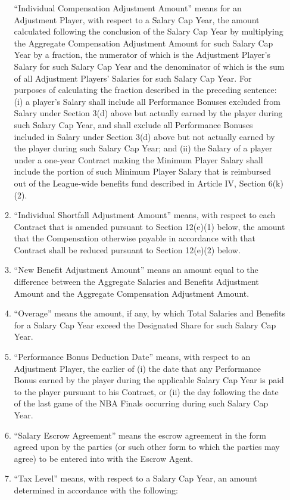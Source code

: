 \documentclass[
]{book}
\begin{document}
\begin{enumerate}
\begin{enumerate}
    ``Individual Compensation Adjustment Amount'' means for an Adjustment Player, with respect to a Salary Cap Year, the amount calculated following the conclusion of the Salary Cap Year by multiplying the Aggregate Compensation Adjustment Amount for such Salary Cap Year by a fraction, the numerator of which is the Adjustment Player's Salary for such Salary Cap Year and the denominator of which is the sum of all Adjustment Players' Salaries for such Salary Cap Year. For purposes of calculating the fraction described in the preceding sentence: (i) a player's Salary shall include all Performance Bonuses excluded from Salary under Section 3(d) above but actually earned by the player during such Salary Cap Year, and shall exclude all Performance Bonuses included in Salary under Section 3(d) above but not actually earned by the player during such Salary Cap Year; and (ii) the Salary of a player under a one-year Contract making the Minimum Player Salary shall include the portion of such Minimum Player Salary that is reimbursed out of the League-wide benefits fund described in Article IV, Section 6(k)(2).
  \item
    ``Individual Shortfall Adjustment Amount'' means, with respect to each Contract that is amended pursuant to Section 12(e)(1) below, the amount that the Compensation otherwise payable in accordance with that Contract shall be reduced pursuant to Section 12(e)(2) below.
  \item
    ``New Benefit Adjustment Amount'' means an amount equal to the difference between the Aggregate Salaries and Benefits Adjustment Amount and the Aggregate Compensation Adjustment Amount.
  \item
    ``Overage'' means the amount, if any, by which Total Salaries and Benefits for a Salary Cap Year exceed the Designated Share for such Salary Cap Year.
  \item
    ``Performance Bonus Deduction Date'' means, with respect to an Adjustment Player, the earlier of (i) the date that any Performance Bonus earned by the player during the applicable Salary Cap Year is paid to the player pursuant to his Contract, or (ii) the day following the date of the last game of the NBA Finals occurring during such Salary Cap Year.
  \item
    ``Salary Escrow Agreement'' means the escrow agreement in the form agreed upon by the parties (or such other form to which the parties may agree) to be entered into with the Escrow Agent.
  \item
    ``Tax Level'' means, with respect to a Salary Cap Year, an amount determined in accordance with the following:


\end{enumerate}
\end{enumerate}
\end{document}
